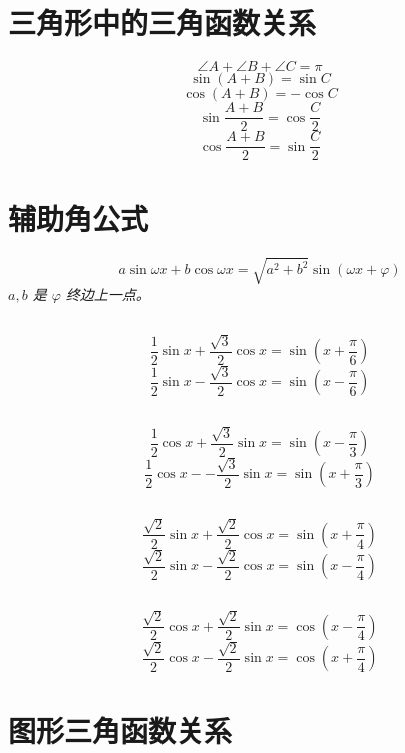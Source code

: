 \documentclass[a4paper, fleqn]{ctexart}
\begin{document}
\begin{multicols}{2}
	{
		\section{三角形中的三角函数关系}
		\[\angle A + \angle B + \angle C = \pi \]
		\[ \sin\left (A + B \right ) = \sin C \]
		\[ \cos\left (A + B \right ) = -\cos C \]
		\[ \sin\frac{A + B}{2} = \cos \frac C2 \]
		\[ \cos\frac{A + B}{2} = \sin \frac C2 \]
		
		\section{辅助角公式}
		\[ a\sin\omega x + b \cos \omega x
		= \sqrt{a^2 + b^2} \sin \left ( \omega x + \varphi \right ) \]
		\emph{$ a, b $ 是 $\varphi$ 终边上一点。}
		
		\subsection{}
		\[ \frac12 \sin x + \frac{\sqrt3} 2 \cos x 
		= \sin \left (x + \frac\pi6\right ) \]
		\[ \frac12 \sin x - \frac{\sqrt3} 2 \cos x 
		= \sin \left (x - \frac\pi6\right ) \]
		\subsection{}
		\[ \frac12 \cos x + \frac{\sqrt3} 2 \sin x 
		= \sin \left (x - \frac\pi3\right ) \]
		\[ \frac12 \cos x --\frac{\sqrt3} 2 \sin x 
		= \sin \left (x + \frac\pi3\right ) \]
		\subsection{}	
		\[ \frac{\sqrt2} 2 \sin x + \frac{\sqrt2} 2 \cos x 
		= \sin \left (x + \frac\pi4\right ) \]
		\[ \frac{\sqrt2} 2 \sin x - \frac{\sqrt2} 2 \cos x 
		= \sin \left (x - \frac\pi4\right ) \]
		\subsection{}	
		\[ \frac{\sqrt2} 2 \cos x + \frac{\sqrt2} 2 \sin x 
		= \cos \left (x - \frac\pi4\right ) \]
		\[ \frac{\sqrt2} 2 \cos x - \frac{\sqrt2} 2 \sin x 
		= \cos \left (x + \frac\pi4\right ) \]
	}
	
	\section{图形三角函数关系}
	{
}
\end{multicols}
\end{document}
